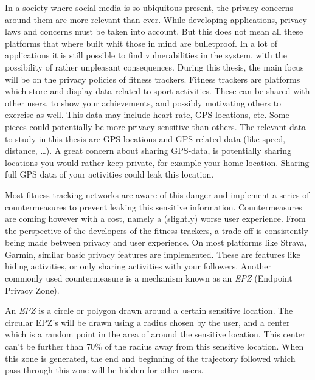 In a society where social media is so ubiquitous present, the privacy concerns
around them are more relevant than ever. While developing applications, privacy
laws and concerns must be taken into account. But this does not mean all these
platforms that where built whit those in mind are bulletproof. In a lot of
applications it is still possible to find vulnerabilities in the system, with
the possibility of rather unpleasant consequences. During this thesis, the main
focus will be on the privacy policies of fitness trackers. Fitness trackers are
platforms which store and display data related to sport activities. These can
be shared with other users, to show your achievements, and possibly motivating
others to exercise as well. This data may include heart rate, GPS-locations,
etc. Some pieces could potentially be more privacy-sensitive than others. The
relevant data to study in this thesis are GPS-locations and GPS-related data
(like speed, distance, \ldots). A great concern about sharing GPS-data, is
potentially sharing locations you would rather keep private, for example your
home location. Sharing full GPS data of your activities could leak this
location.

Most fitness tracking networks are aware of this danger and implement a series
of countermeasures to prevent leaking this sensitive information.
Countermeasures are coming however with a cost, namely a (slightly) worse user
experience. From the perspective of the developers of the fitness trackers, a
trade-off is consistently being made between privacy and user experience. On
most platforms like Strava, Garmin, similar basic privacy features are
implemented. These are features like hiding activities, or only sharing
activities with your followers. Another commonly used countermeasure is a
mechanism known as an \textit{EPZ} (Endpoint Privacy Zone).

An \textit{EPZ} is a circle or polygon drawn around a certain sensitive
location. The circular EPZ's will be drawn using a radius chosen by the user,
and a center which is a random point in the area of around the sensitive
location. This center can't be further than 70\% of the radius away from this
sensitive location. When this zone is generated, the end and beginning of the
trajectory followed which pass through this zone will be hidden for other
users.

